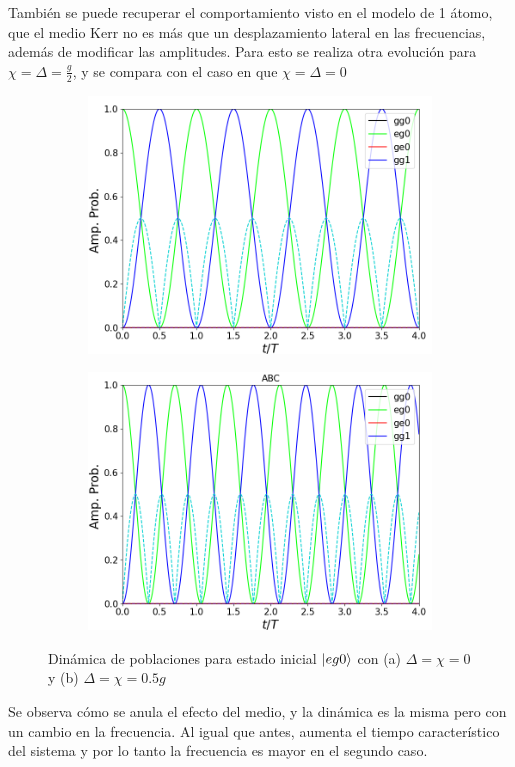 También se puede recuperar el comportamiento visto en el modelo de 1 átomo, que el medio Kerr no es más que un desplazamiento lateral en las frecuencias, además de modificar las amplitudes. Para esto se realiza otra evolución para $\chi=\Delta=\frac{g}{2}$, y se compara con el caso en que $\chi=\Delta=0$
\begin{figure}[h]
    \centering
    \begin{subfigure}{0.49\textwidth}
        \includegraphics[width=\textwidth]{figuras/ch4/d=x=0 eg0 abc.png}
        \caption{}
        \label{fig4:comparacion kerr pob 1}
    \end{subfigure}
    \hfill
    \begin{subfigure}{0.49\textwidth}
        \includegraphics[width=\textwidth]{figuras/ch4/d=x=0.5 eg0 abc.png}
        \caption{}
        \label{fig4:comparacion ker pob 2}
    \end{subfigure}
    \caption{Dinámica de poblaciones para estado inicial $\ket{eg0}$ con (a) $\Delta=\chi=0$ y (b) $\Delta=\chi=0.5g$}
    \label{fig4:comparacion d vs x}
\end{figure}
Se observa cómo se anula el efecto del medio, y la dinámica es la misma pero con un cambio en la frecuencia. Al igual que antes, aumenta el tiempo característico del sistema y por lo tanto la frecuencia es mayor en el segundo caso.

